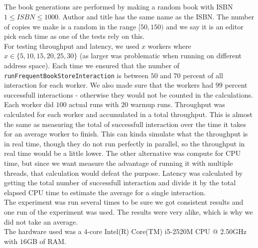 \documentclass[a4paper]{article}
\begin{document}
\subsection{}
The book generations are performed by making a random book with ISBN $1\leq ISBN\leq 1000$. Author and title has the same name as the ISBN. The number of copies we make is a random in the range $[50, 150)$ and we say it is an editor pick each time as one of the tests rely on this. \\
  For testing throughput and latency, we used $x$ workers where $x\in \{5,10,15,20,25,30\}$ (as larger was problematic when running on different address space). Each time we ensured that the number of \texttt{runFrequentBookStoreInteraction} is between $50$ and $70$ percent of all interaction for each worker. We also made sure that the workers had $99$ percent successfull interactions - otherwise they would not be counted in the calculations. \\
  Each worker did $100$ actual runs with $20$ warmup runs. Throughput was calculated for each worker and accumulated in a total throughput. This is almost the same as measuring the total of successfull interaction over the time it takes for an average worker to finish. This can kinda simulate what the throughput is in real time, though they do not run perfectly in parallel, so the throughput in real time would be a little lower. The other alternative was compute for CPU time, but since we want measure the advantage of running it with multiple threads, that calculation would defeat the purpose. Latency was calculated by getting the total number of successfull interaction and divide it by the total elapsed CPU time to estimate the average for a single interaction. \\
The experiment was run several times to be sure we got consistent results and one run of the experiment was used. The results were very alike, which is why we did not take an average.\\
The hardware used was a $4$-core Intel(R) Core(TM) i5-2520M CPU @ 2.50GHz with $16$GB of RAM.
\end{document}
